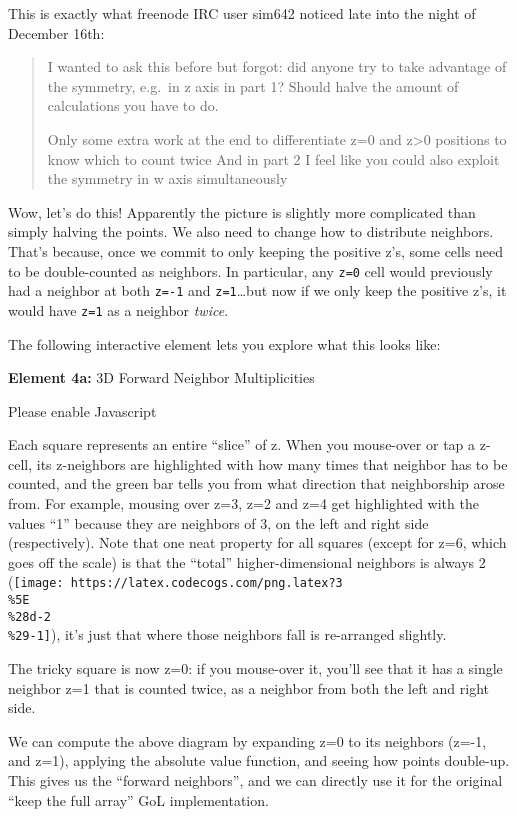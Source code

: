 \documentclass[]{article}
\begin{document}
This is exactly what freenode IRC user sim642 noticed late into the night of
December 16th:

\begin{quote}
I wanted to ask this before but forgot: did anyone try to take advantage of the
symmetry, e.g.~in z axis in part 1? Should halve the amount of calculations you
have to do.

Only some extra work at the end to differentiate z=0 and z\textgreater0
positions to know which to count twice And in part 2 I feel like you could also
exploit the symmetry in w axis simultaneously
\end{quote}

Wow, let's do this! Apparently the picture is slightly more complicated than
simply halving the points. We also need to change how to distribute neighbors.
That's because, once we commit to only keeping the positive z's, some cells need
to be double-counted as neighbors. In particular, any \texttt{z=0} cell would
previously had a neighbor at both \texttt{z=-1} and \texttt{z=1}\ldots but now
if we only keep the positive z's, it would have \texttt{z=1} as a neighbor
\emph{twice}.

The following interactive element lets you explore what this looks like:

\leavevmode\hypertarget{golSyms3DForward}{}%
\textbf{Element 4a:} 3D Forward Neighbor Multiplicities

\leavevmode\hypertarget{golSyms3DForwardCont}{}%
Please enable Javascript

Each square represents an entire ``slice'' of z. When you mouse-over or tap a
z-cell, its z-neighbors are highlighted with how many times that neighbor has to
be counted, and the green bar tells you from what direction that neighborship
arose from. For example, mousing over z=3, z=2 and z=4 get highlighted with the
values ``1'' because they are neighbors of 3, on the left and right side
(respectively). Note that one neat property for all squares (except for z=6,
which goes off the scale) is that the ``total'' higher-dimensional neighbors is
always 2
(\texttt{[image: https://latex.codecogs.com/png.latex?3\\\%5E\\\%28d-2\\\%29-1]}),
it's just that where those neighbors fall is re-arranged slightly.

The tricky square is now z=0: if you mouse-over it, you'll see that it has a
single neighbor z=1 that is counted twice, as a neighbor from both the left and
right side.

We can compute the above diagram by expanding z=0 to its neighbors (z=-1, and
z=1), applying the absolute value function, and seeing how points double-up.
This gives us the ``forward neighbors'', and we can directly use it for the
original ``keep the full array'' GoL implementation.
\end{document}
